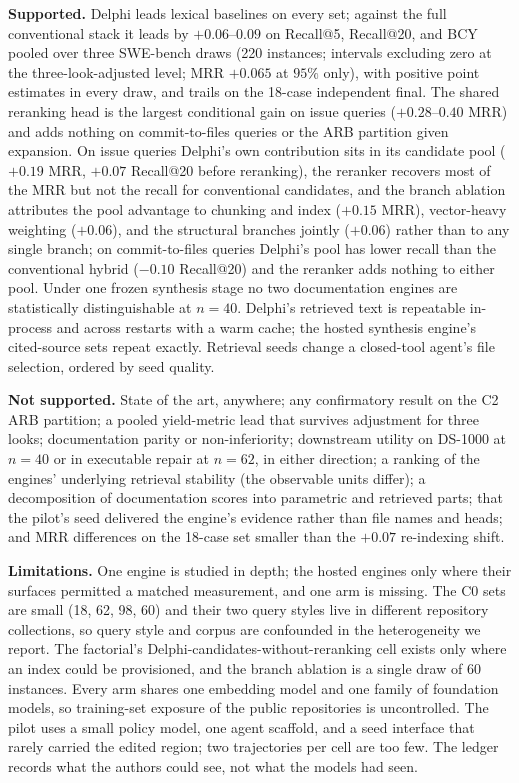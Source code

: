 \documentclass{article}
\newcommand{\system}{Delphi}
\begin{document}
\textbf{Supported.} \system{} leads lexical baselines on every set; against the full conventional stack it leads by $+0.06$--$0.09$ on Recall@5, Recall@20, and BCY pooled over three SWE-bench draws (220 instances; intervals excluding zero at the three-look-adjusted level; MRR $+0.065$ at $95\%$ only), with positive point estimates in every draw, and trails on the 18-case independent final. The shared reranking head is the largest conditional gain on issue queries ($+0.28$--$0.40$ MRR) and adds nothing on commit-to-files queries or the ARB partition given expansion. On issue queries \system{}'s own contribution sits in its candidate pool ($+0.19$ MRR, $+0.07$ Recall@20 before reranking), the reranker recovers most of the MRR but not the recall for conventional candidates, and the branch ablation attributes the pool advantage to chunking and index ($+0.15$ MRR), vector-heavy weighting ($+0.06$), and the structural branches jointly ($+0.06$) rather than to any single branch; on commit-to-files queries \system{}'s pool has lower recall than the conventional hybrid ($-0.10$ Recall@20) and the reranker adds nothing to either pool. Under one frozen synthesis stage no two documentation engines are statistically distinguishable at $n{=}40$. \system{}'s retrieved text is repeatable in-process and across restarts with a warm cache; the hosted synthesis engine's cited-source sets repeat exactly. Retrieval seeds change a closed-tool agent's file selection, ordered by seed quality.

\textbf{Not supported.} State of the art, anywhere; any confirmatory result on the C2 ARB partition; a pooled yield-metric lead that survives adjustment for three looks; documentation parity or non-inferiority; downstream utility on DS-1000 at $n{=}40$ or in executable repair at $n{=}62$, in either direction; a ranking of the engines' underlying retrieval stability (the observable units differ); a decomposition of documentation scores into parametric and retrieved parts; that the pilot's seed delivered the engine's evidence rather than file names and heads; and MRR differences on the 18-case set smaller than the $+0.07$ re-indexing shift.

\textbf{Limitations.} One engine is studied in depth; the hosted engines only where their surfaces permitted a matched measurement, and one arm is missing. The C0 sets are small (18, 62, 98, 60) and their two query styles live in different repository collections, so query style and corpus are confounded in the heterogeneity we report. The factorial's \system{}-candidates-without-reranking cell exists only where an index could be provisioned, and the branch ablation is a single draw of 60 instances. Every arm shares one embedding model and one family of foundation models, so training-set exposure of the public repositories is uncontrolled. The pilot uses a small policy model, one agent scaffold, and a seed interface that rarely carried the edited region; two trajectories per cell are too few. The ledger records what the authors could see, not what the models had seen.
\end{document}
